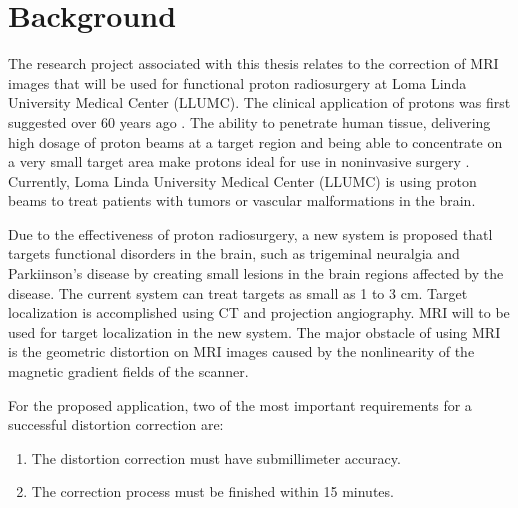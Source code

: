 \section{Background}

The research project associated with this thesis relates to the correction of MRI images that will be used 
for functional proton radiosurgery at Loma Linda University Medical Center (LLUMC).
The clinical application of protons was first suggested over 60 years ago \cite{Wil46}.
The ability to penetrate human tissue, delivering high dosage of proton beams at a target
region and being able to concentrate on a very small target area make protons ideal for use in noninvasive 
surgery \cite{Wil46}. Currently, Loma Linda University
Medical Center (LLUMC) is using proton beams to treat patients with tumors or
vascular malformations in the brain.

Due to the effectiveness of proton radiosurgery, a new system is proposed thatl targets functional 
disorders in the brain, such as trigeminal neuralgia and Parkiinson's disease by creating small lesions in 
the brain regions affected by the disease.
The current system can treat targets as small as 1 to 3 cm.  
Target localization is accomplished using CT and projection angiography.
MRI will to be used for target localization in the new system.
The major obstacle of using MRI is the geometric distortion on MRI images caused by the nonlinearity of the magnetic gradient fields of the scanner.

For the proposed application, two of the most important requirements for a successful distortion 
correction are:
\begin{enumerate}
\item The distortion correction must have submillimeter accuracy.
\item The correction process must be finished within 15 minutes.
\end{enumerate}



